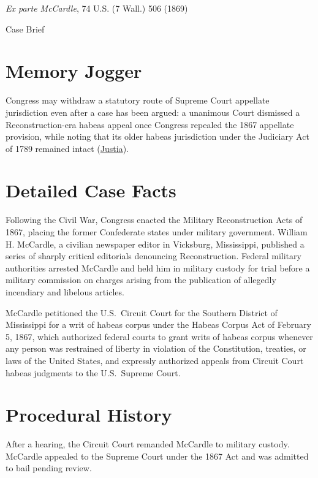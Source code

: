 \documentclass[12pt]{article}
\begin{document}
\begin{center}
{\LARGE \textit{Ex parte McCardle}, 74 U.S. (7 Wall.) 506 (1869)\par}
\vspace{0.8em}
{\large Case Brief\par}
\end{center}
\vspace{1em}

\section{Memory Jogger}
Congress may withdraw a statutory route of Supreme Court appellate jurisdiction even after a case has been argued: a unanimous Court dismissed a Reconstruction-era habeas appeal once Congress repealed the 1867 appellate provision, while noting that its older habeas jurisdiction under the Judiciary Act of 1789 remained intact (\href{https://supreme.justia.com/cases/federal/us/74/506/}{Justia}).

\section{Detailed Case Facts}
Following the Civil War, Congress enacted the Military Reconstruction Acts of 1867, placing the former Confederate states under military government. William H. McCardle, a civilian newspaper editor in Vicksburg, Mississippi, published a series of sharply critical editorials denouncing Reconstruction. Federal military authorities arrested McCardle and held him in military custody for trial before a military commission on charges arising from the publication of allegedly incendiary and libelous articles.

McCardle petitioned the U.S.\ Circuit Court for the Southern District of Mississippi for a writ of habeas corpus under the Habeas Corpus Act of February 5, 1867, which authorized federal courts to grant writs of habeas corpus whenever any person was restrained of liberty in violation of the Constitution, treaties, or laws of the United States, and expressly authorized appeals from Circuit Court habeas judgments to the U.S.\ Supreme Court.

\section{Procedural History}
After a hearing, the Circuit Court remanded McCardle to military custody. McCardle appealed to the Supreme Court under the 1867 Act and was admitted to bail pending review.
\end{document}
